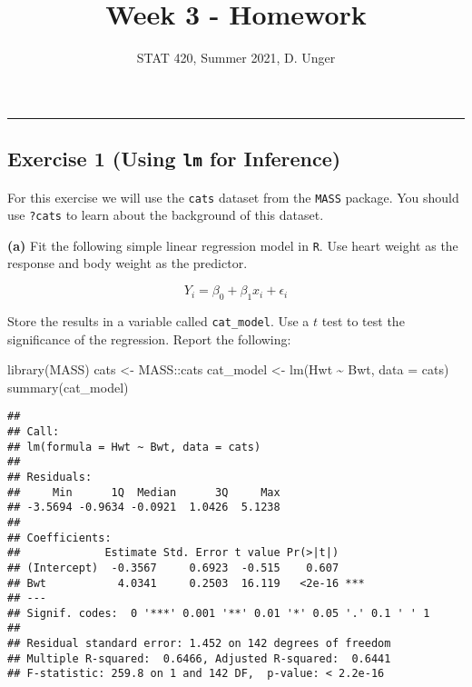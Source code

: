 \documentclass[
]{article}
\title{Week 3 - Homework}
\author{STAT 420, Summer 2021, D. Unger}
\date{}
\newenvironment{Shaded}{\begin{snugshade}}{\end{snugshade}}
\newcommand{\AttributeTok}[1]{\textcolor[rgb]{0.77,0.63,0.00}{#1}}
\newcommand{\FunctionTok}[1]{\textcolor[rgb]{0.00,0.00,0.00}{#1}}
\newcommand{\NormalTok}[1]{#1}
\newcommand{\OtherTok}[1]{\textcolor[rgb]{0.56,0.35,0.01}{#1}}
\newcommand{\SpecialCharTok}[1]{\textcolor[rgb]{0.00,0.00,0.00}{#1}}
\begin{document}
\maketitle

\begin{center}\rule{0.5\linewidth}{0.5pt}\end{center}

\hypertarget{exercise-1-using-lm-for-inference}{%
\subsection{\texorpdfstring{Exercise 1 (Using \texttt{lm} for
Inference)}{Exercise 1 (Using lm for Inference)}}\label{exercise-1-using-lm-for-inference}}

For this exercise we will use the \texttt{cats} dataset from the
\texttt{MASS} package. You should use \texttt{?cats} to learn about the
background of this dataset.

\textbf{(a)} Fit the following simple linear regression model in
\texttt{R}. Use heart weight as the response and body weight as the
predictor.

\[
Y_i = \beta_0 + \beta_1 x_i + \epsilon_i
\]

Store the results in a variable called \texttt{cat\_model}. Use a \(t\)
test to test the significance of the regression. Report the following:

\begin{Shaded}
\begin{Highlighting}[]
\FunctionTok{library}\NormalTok{(MASS)}
\NormalTok{cats }\OtherTok{\textless{}{-}}\NormalTok{ MASS}\SpecialCharTok{::}\NormalTok{cats}
\NormalTok{cat\_model }\OtherTok{\textless{}{-}} \FunctionTok{lm}\NormalTok{(Hwt }\SpecialCharTok{\textasciitilde{}}\NormalTok{ Bwt, }\AttributeTok{data =}\NormalTok{ cats)}
\FunctionTok{summary}\NormalTok{(cat\_model)}
\end{Highlighting}
\end{Shaded}

\begin{verbatim}
## 
## Call:
## lm(formula = Hwt ~ Bwt, data = cats)
## 
## Residuals:
##     Min      1Q  Median      3Q     Max 
## -3.5694 -0.9634 -0.0921  1.0426  5.1238 
## 
## Coefficients:
##             Estimate Std. Error t value Pr(>|t|)    
## (Intercept)  -0.3567     0.6923  -0.515    0.607    
## Bwt           4.0341     0.2503  16.119   <2e-16 ***
## ---
## Signif. codes:  0 '***' 0.001 '**' 0.01 '*' 0.05 '.' 0.1 ' ' 1
## 
## Residual standard error: 1.452 on 142 degrees of freedom
## Multiple R-squared:  0.6466, Adjusted R-squared:  0.6441 
## F-statistic: 259.8 on 1 and 142 DF,  p-value: < 2.2e-16
\end{verbatim}
\end{document}
